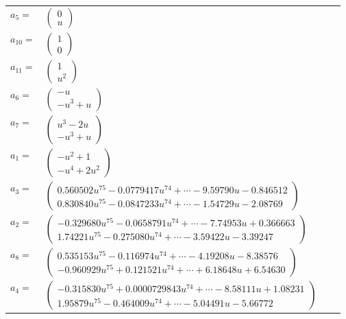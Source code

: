 \documentclass[1p]{elsarticle_modified}
\theoremstyle{definition}
\begin{document}
\begin{tabular}{m{7pt} m{180pt} m{7pt} m{180pt} }
\flushright $a_{5}=$&$\begin{pmatrix}0\\u\end{pmatrix}$ \\
\flushright $a_{10}=$&$\begin{pmatrix}1\\0\end{pmatrix}$ \\
\flushright $a_{11}=$&$\begin{pmatrix}1\\u^2\end{pmatrix}$ \\
\flushright $a_{6}=$&$\begin{pmatrix}- u\\- u^3+u\end{pmatrix}$ \\
\flushright $a_{7}=$&$\begin{pmatrix}u^3-2 u\\- u^3+u\end{pmatrix}$ \\
\flushright $a_{1}=$&$\begin{pmatrix}- u^2+1\\- u^4+2 u^2\end{pmatrix}$ \\
\flushright $a_{3}=$&$\begin{pmatrix}0.560502 u^{75}-0.0779417 u^{74}+\cdots-9.59790 u-0.846512\\0.830840 u^{75}-0.0847233 u^{74}+\cdots-1.54729 u-2.08769\end{pmatrix}$ \\
\flushright $a_{2}=$&$\begin{pmatrix}-0.329680 u^{75}-0.0658791 u^{74}+\cdots-7.74953 u+0.366663\\1.74221 u^{75}-0.275080 u^{74}+\cdots-3.59422 u-3.39247\end{pmatrix}$ \\
\flushright $a_{8}=$&$\begin{pmatrix}0.535153 u^{75}-0.116974 u^{74}+\cdots-4.19208 u-8.38576\\-0.960929 u^{75}+0.121521 u^{74}+\cdots+6.18648 u+6.54630\end{pmatrix}$ \\
\flushright $a_{4}=$&$\begin{pmatrix}-0.315830 u^{75}+0.0000729843 u^{74}+\cdots-8.58111 u+1.08231\\1.95879 u^{75}-0.464009 u^{74}+\cdots-5.04491 u-5.66772\end{pmatrix}$ \\

\end{tabular}
\end{document}

